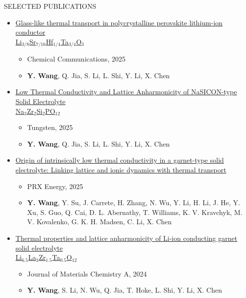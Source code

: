 \documentclass{resume} %
\begin{document}
\begin{rSection}{SELECTED PUBLICATIONS}
\begin{itemize}
\item \href{https://doi.org/10.1039/D5CC04693A}{Glass-like thermal transport in polycrystalline perovskite lithium-ion conductor \\ Li$_{3/8}$Sr$_{7/16}$Hf$_{1/4}$Ta$_{3/4}$O$_3$}
    \begin{itemize}
        \item Chemical Communications, 2025
        \item \textbf{Y. Wang}, Q. Jia, S. Li, L. Shi, Y. Li, X. Chen
    \end{itemize}

\item \href{https://doi.org/10.1007/s42864-025-00357-6}{Low Thermal Conductivity and Lattice Anharmonicity of NaSICON-type Solid Electrolyte \\ Na$_3$Zr$_2$Si$_2$PO$_{12}$}
    \begin{itemize}
        \item Tungsten, 2025
        \item \textbf{Y. Wang}, Q. Jia, S. Li, L. Shi, Y. Li, X. Chen
    \end{itemize}

\item \href{https://doi.org/10.1103/6wj2-kzhh}{Origin of intrinsically low thermal conductivity in a garnet-type solid electrolyte: Linking lattice and ionic dynamics with thermal transport}
    \begin{itemize}
        \item PRX Energy, 2025
        \item \textbf{Y. Wang}, Y. Su, J. Carrete, H. Zhang, N. Wu, Y. Li, H. Li, J. He, Y. Xu, S. Guo, Q. Cai, D. L. Abernathy, T. Williams, K. V. Kravchyk, M. V. Kovalenko, G. K. H. Madsen, C. Li, X. Chen
    \end{itemize}

\item \href{https://doi.org/10.1039/D4TA02264E}{Thermal properties and lattice anharmonicity of Li-ion conducting garnet solid electrolyte \\ Li$_{6.5}$La$_3$Zr$_{1.5}$Ta$_{0.5}$O$_{12}$}
    \begin{itemize}
        \item Journal of Materials Chemistry A, 2024
        \item \textbf{Y. Wang}, S. Li, N. Wu, Q. Jia, T. Hoke, L. Shi, Y. Li, X. Chen
    \end{itemize}


\end{itemize}
\end{rSection}
\end{document}
